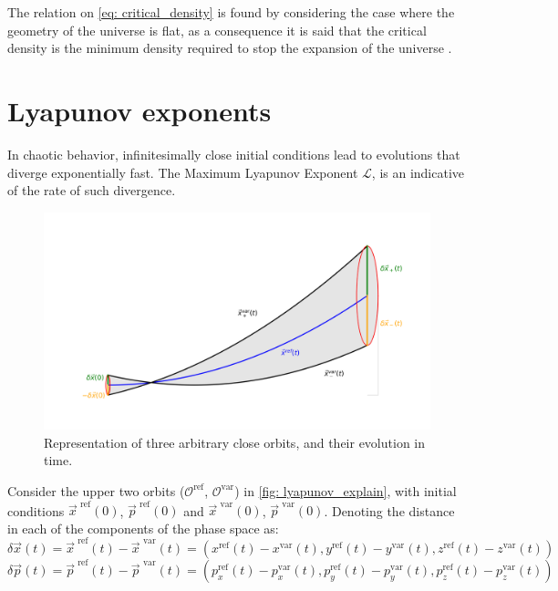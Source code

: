 	The relation on \autoref{eq: critical_density} is found by considering the case where the geometry of the universe is flat, as a consequence it is said that the critical density is the minimum density required to stop the expansion of the universe \cite{binney2011galactic}.
	
\chapter{Lyapunov exponents}
	In chaotic behavior, infinitesimally close initial conditions lead to evolutions that diverge exponentially fast. The Maximum Lyapunov Exponent $\mathcal{L}$, is an indicative of the rate of such divergence.
	\begin{figure}[h]
		\centering
		\includegraphics[width = 0.7\linewidth]{"../Files/Week 9/lyapunov_explain"}
		\caption{Representation of three arbitrary close orbits, and their evolution in time.}
		\label{fig: lyapunov_explain}
	\end{figure}
	
	Consider the upper two orbits ($\mathcal{O}^\text{ref}$, $\mathcal{O}^\text{var}$) in \autoref{fig: lyapunov_explain}, with initial conditions $\vec{x}^\text{ ref}(0)$, $\vec{p}^\text{ ref}(0)$ and $\vec{x}^\text{ var}(0)$, $\vec{p}^\text{ var}(0)$. Denoting the distance in each of the components of the phase space as:
	\begin{equation}\label{eq: deltax}
		\delta\vec{x}(t) = \vec{x}^\text{ ref}(t) - \vec{x}^\text{ var}(t) = \left(x^\text{ref}(t) - x^\text{var}(t), y^\text{ref}(t) - y^\text{var}(t), z^\text{ref}(t) - z^\text{var}(t)\right)
	\end{equation}
	\begin{equation}\label{eq: deltap}
		\delta\vec{p}(t) = \vec{p}^\text{ ref}(t) - \vec{p}^\text{ var}(t) = \left(p_x^\text{ref}(t) - p_x^\text{var}(t), p_y^\text{ref}(t) - p_y^\text{var}(t), p_z^\text{ref}(t) - p_z^\text{var}(t)\right)
	\end{equation}
	
